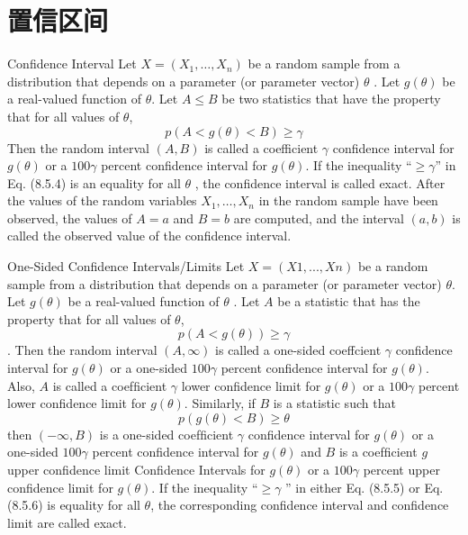 \documentclass[../main.tex]{subfiles}
\begin{document}
\section{置信区间}
\begin{definition}{Conﬁdence Interval}{}
Let $X = (X_1, \dots , X_n)$ be a random sample from a distribution that depends on a parameter (or parameter vector) $θ$ . Let $g(θ)$ be a real-valued function of $θ$. Let $A \leqslant B$ be two statistics that have the property that for all values of $θ$,
\begin{equation}\label{}
p(A < g(\theta) < B) \geqslant \gamma
\end{equation}
Then the random interval $(A, B)$ is called a coefficient $\gamma$ conﬁdence interval for $g(θ)$ or a $100\gamma$ percent conﬁdence interval for $g(θ)$. If the inequality “$\geqslant\gamma$” in Eq. (8.5.4)
is an equality for all $\theta$ , the conﬁdence interval is called exact. After the values of the random variables $X_1, \dots , X_n$ in the random sample have been observed, the values of $A = a$ and $B = b$ are computed, and the interval $(a, b)$ is called the observed value of the conﬁdence interval.
\end{definition}


\begin{definition}{One-Sided Conﬁdence Intervals/Limits}{}
Let $X = (X1, . . . , Xn)$ be a random sample from a distribution that depends on a parameter (or parameter vector) $\theta$. Let $g(\theta)$ be a real-valued function of $\theta$ . Let $A$ be a statistic that has the property that for all values of $\theta$, 
\begin{equation}\label{}
p(A < g(\theta)) \geqslant \gamma
\end{equation}.
Then the random interval $\left(A, \infty\right)$ is called a one-sided coeffcient $\gamma$ conﬁdence interval for $g(\theta)$ or a one-sided $100\gamma$ percent conﬁdence interval for $g(\theta)$. Also, $A$ is called a coefﬁcient $\gamma$ lower conﬁdence limit for $g(\theta)$ or a $100\gamma$ percent lower conﬁdence limit for $g(\theta)$. Similarly, if $B$ is a statistic such that 
\begin{equation}\label{}
p(g(\theta) < B) \geqslant \theta
\end{equation}
then $\left(−\infty, B\right)$ is a one-sided coefﬁcient $\gamma$ conﬁdence interval for $g(\theta)$ or a one-sided $100\gamma$ percent conﬁdence interval for $g(\theta)$ and $B$ is a coefﬁcient $	g$ upper conﬁdence limit Conﬁdence Intervals for $g(\theta)$ or a $100\gamma$ percent upper conﬁdence limit for $g(\theta)$. If the inequality “$\geqslant \gamma$ ” in either Eq. (8.5.5) or Eq. (8.5.6) is equality for all $\theta$, the corresponding conﬁdence
interval and conﬁdence limit are called exact.
\end{definition}
\end{document}
